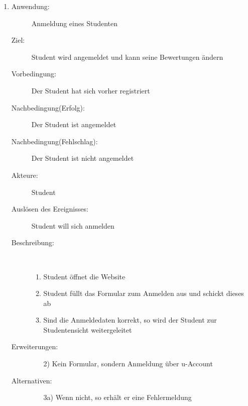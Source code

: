 \documentclass[parskip=full]{scrartcl}
\newcommand{\swtLabel}[1]{\textbf{\textbackslash #1\arabic*0\textbackslash}}
\begin{document}
\begin{enumerate}[label=\swtLabel{S}]
  \item
    \begin{description}
    \item[Anwendung:] Anmeldung eines Studenten
    \item[Ziel:] Student wird angemeldet und kann seine Bewertungen ändern
  	\item[Vorbedingung:] Der Student hat sich vorher registriert
  	\item[Nachbedingung(Erfolg):] Der Student ist angemeldet
  	\item[Nachbedingung(Fehlschlag):] Der Student ist nicht angemeldet
  	\item[Akteure:] Student
  	\item[Auslösen des Ereignisses:] Student will sich anmelden
  	\item[Beschreibung:]~
  	\begin{enumerate}
  	  \item Student öffnet die Website
  	  \item Student füllt das Formular zum Anmelden aus und schickt dieses ab
  	  \item Sind die Anmeldedaten korrekt, so wird der Student zur Studentensicht
  	  weitergeleitet
  	\end{enumerate}
  	\item[Erweiterungen:]
  	\begin{enumerate}
  	  \item[2)] Kein Formular, sondern Anmeldung über u-Account
  	\end{enumerate}    	
  	\item[Alternativen:]
	\begin{enumerate}
  	  \item[3a)] Wenn nicht, so erhält er eine Fehlermeldung
  	\end{enumerate}
  \end{description}
   

\end{enumerate}
\end{document}

